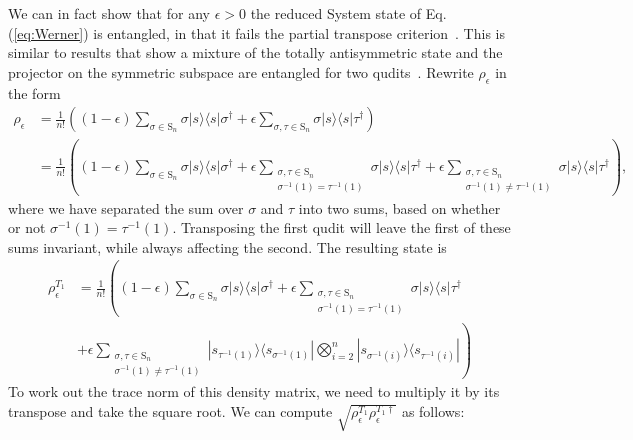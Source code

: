 We can in fact show that for any $\epsilon>0$ the reduced System state of Eq.(\ref{eq:Werner}) is entangled, in that it fails the partial transpose criterion~\cite{chen2002}.
This is similar to results that show a mixture of the totally antisymmetric state and the projector on the symmetric subspace are entangled for two qudits~\cite{breuer2006}.
Rewrite $\rho_\epsilon$ in the form
\begin{align}
\rho_\epsilon
 &= \frac{1}{n!}\left((1-\epsilon)\sum_{\sigma\in \textrm{S}_n}\sigma|s\rangle\langle s|\sigma^\dagger + \epsilon\sum_{\sigma,\tau \in \textrm{S}_n}\sigma|s\rangle\langle s|\tau^\dagger\right)\\
 &= \frac{1}{n!}\left((1-\epsilon)\sum_{\sigma\in \textrm{S}_n}\sigma|s\rangle\langle s|\sigma^\dagger + \epsilon\sum_{\substack{\sigma,\tau \in \textrm{S}_n\\\sigma^{-1}(1) = \tau^{-1}(1)}}\sigma|s\rangle\langle s|\tau^\dagger + \epsilon\sum_{\substack{\sigma,\tau \in \textrm{S}_n\\\sigma^{-1}(1) \neq \tau^{-1}(1)}}\sigma|s\rangle\langle s|\tau^\dagger\right) ,
\end{align}
where we have separated the sum over $\sigma$ and $\tau$ into two sums, based on whether or not $\sigma^{-1}(1) = \tau^{-1}(1)$. 
Transposing the first qudit will leave the first of these sums invariant, while always affecting the second. 
The resulting state is
\begin{align}
\rho_{\epsilon}^{T_1}&=
\frac{1}{n!} \left((1-\epsilon)\sum_{\sigma\in \textrm{S}_n}\sigma|s\rangle\langle s|\sigma^\dagger + \epsilon\sum_{\substack{\sigma,\tau \in \textrm{S}_n\\\sigma^{-1}(1) = \tau^{-1}(1)}}\sigma|s\rangle\langle s|\tau^\dagger\right.\nonumber\\
&\left.+ \epsilon\sum_{\substack{\sigma,\tau \in \textrm{S}_n\\\sigma^{-1}(1) \neq \tau^{-1}(1)}}|s_{\tau^{-1}(1)}\rangle\langle s_{\sigma^{-1}(1)}|\bigotimes_{i=2}^n|s_{\sigma^{-1}(i)}\rangle\langle s_{\tau^{-1}(i)}|\right)
\end{align}
To work out the trace norm of this density matrix, we need to multiply it by its transpose and take the square root. 
We can compute $\sqrt{\rho_{\epsilon}^{T_1}\rho_{\epsilon}^{T_1\dagger}}$ as follows:
